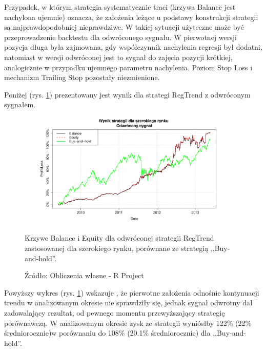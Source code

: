 \documentclass[man,mfu]{mgrwms}
\begin{document}
Przypadek, w którym strategia systematycznie traci (krzywa Balance jest nachylona ujemnie) oznacza, że założenia leżące u podstawy konstrukcji strategii są najprawdopodobniej nieprawdziwe. W takiej sytuacji użyteczne może być przeprowadzenie backtestu dla odwróconego sygnału. W pierwotnej wersji pozycja długa była zajmowana, gdy współczynnik nachylenia regresji był dodatni, natomiast w wersji odwróconej jest to sygnał do zajęcia pozycji krótkiej, analogicznie w przypadku ujemnego parametru nachylenia. Poziom Stop Loss i mechanizm Trailing Stop pozostały niezmienione.

Poniżej (rys. \ref{fig:revallmarket}) prezentowany jest wynik dla strategi RegTrend z odwróconym sygnałem.
\begin{figure}[H]
\centering
\vspace{-10pt}
\includegraphics[width=110mm,height = 55mm]{revallmarket}
\vspace{-10pt}
\caption{Krzywe Balance i Equity dla odwróconej strategii RegTrend zastosowanej dla szerokiego rynku, porównane ze strategią ,,Buy-and-hold''.}\vspace{-10pt}
\caption*{Źródło: Obliczenia własne - R Project}\vspace{-20pt}
\label{fig:revallmarket}
\end{figure}

Powyższy wykres (rys. \ref{fig:revallmarket}) wskazuje , że pierwotne założenia odnośnie kontynuacji trendu w analizowanym okresie nie sprawdziły się, jednak sygnał odwrotny dał zadowalający rezultat, od pewnego momentu przewyższający strategię porównawczą. W analizowanym okresie zysk ze strategii wyniósłby 122\% (22\% średniorocznie)w porównaniu do 108\% (20.1\% średniorocznie) dla ,,Buy-and-hold''.
\end{document}
